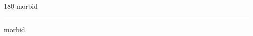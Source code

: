 
\begin{frame}
\begin{center}
\begin{turn}{180}
{\fontsize{2.5cm}{1em}\selectfont morbid}
\end{turn}
\vspace{1em}\par  
\hrule
\vspace{1em}\par  
{\fontsize{2.5cm}{1em}\selectfont morbid}
\end{center}
\end{frame}
